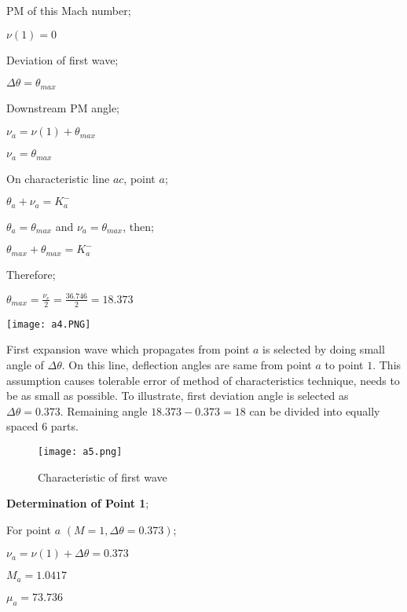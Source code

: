 \begin{appendices}
\begin{minipage}{0.5\textwidth}
	PM of this Mach number;
	
	$\nu(1) = 0$
	
	Deviation of first wave;
	
	$\Delta\theta = \theta_{max}$
	
	Downstream PM angle;
	
	$\nu_a = \nu(1) + \theta_{max}$
	
	$\nu_a = \theta_{max}$
	
	On characteristic line $ac$, point $a$;
	
	$\theta_a + \nu_a = K_a^-$
	
	$\theta_a = \theta_{max}$ and $\nu_a = \theta_{max}$, then;
	
	$\theta_{max} + \theta_{max} = K_a^-$
	
	Therefore; 
	
	$\theta_{max} = \frac{\nu_e}{2}=\frac{36.746}{2}=18.373$
	
\end{minipage}
\begin{minipage}{0.5\textwidth}
	\texttt{[image: a4.PNG]}
\end{minipage}%
\noindent

\pagebreak

\noindent First expansion wave which propagates from point $a$ is selected by doing small angle of $\Delta\theta$. On this line, deflection angles are same from point $a$ to point $1$. This assumption causes tolerable error of method of characteristics technique, needs to be as small as possible. To illustrate, first deviation angle is selected as  $\Delta\theta = 0.373$. Remaining angle $18.373 - 0.373 = 18$ can be divided into equally spaced 6 parts.  

\FloatBarrier
\begin{figure}[!htb]
	\centering
	\texttt{[image: a5.png]}
	\caption{Characteristic of first wave}	
	\label{fig:a5}
\end{figure}
\FloatBarrier

\noindent\textbf{Determination of Point 1};\\

\begin{minipage}{0.65\textwidth}
	
	
	For point $a$ $(M=1, \Delta\theta = 0.373)$;
	
	$\nu_a = \nu(1)+\Delta\theta = 0.373$
	
	$M_a = 1.0417$
	
	$\mu_a = 73.736$
	

\end{minipage}
\end{appendices}

